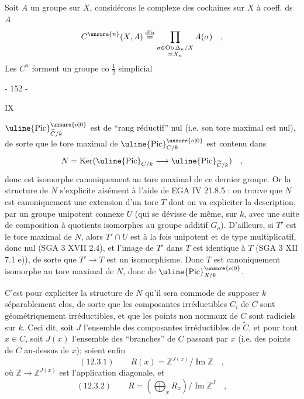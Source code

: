 Soit $A$ un groupe sur $X$, considérons le complexe des cochaines sur $X$ à coeff. ds $A$
\[
C^{\unsure{n}}(X,A)\overset{\mathrm{dfn}}{=}
\prod_{\substack{\sigma\in\operatorname{Ob}\Delta_n/X\\=X_n}}A(\sigma)\quad,
\]
Les $C^n$ forment un groupe co $\frac12$ simplicial



\begin{center}- 152 -\end{center}
\begin{flushright}IX\end{flushright}

$\uline{\operatorname{Pic}}^{\unsure{o|0}}_{\widetilde C/k}$ est de ``rang réductif'' nul (i.e. son tore maximal est nul), de sorte que le tore maximal de $\uline{\operatorname{Pic}}^{\unsure{o|0}}_{C/k}$ est contenu dans
\[
N=\operatorname{Ker}(\uline{\operatorname{Pic}}_{C/k}
\longrightarrow\uline{\operatorname{Pic}}_{\widetilde C/k})\quad,
\]
donc est isomorphe canoniquement au tore maximal de ce dernier groupe. Or la structure de $N$ s'explicite aisément à l'aide de EGA IV 21.8.5 : on trouve que $N$ est canoniquement une extension d'un tore $T$ dont on va expliciter la description, par un groupe unipotent connexe $U$ (qui se dévisse de même, sur $k$, avec une suite de composition à quotients isomorphes au groupe additif $G_a$). D'ailleurs, si $T'$ est le tore maximal de $N$, alors $T'\cap U$ est à la fois unipotent et de type multiplicatif, donc nul (SGA 3 XVII 2.4), et l'image de $T'$ dans $T$ est identique à $T$ (SGA 3 XII 7.1 e)), de sorte que $T'\longrightarrow T$ est un isomorphisme. Donc $T$ est canoniquement isomorphe au tore maximal de $N$, donc de $\uline{\operatorname{Pic}}^{\unsure{o|0}}_{X/k}$.

C'est pour expliciter la structure de $N$ qu'il sera commode de supposer $k$ séparablement clos, de sorte que les composantes irréductibles $C_i$ de $C$ sont géométriquement irréductibles, et que les points non normaux de $C$ sont radiciels sur $k$. Ceci dit, soit $J$ l'ensemble des composantes irréductibles de $\widetilde C$, et pour tout $x\in C$, soit $J(x)$ l'ensemble des ``branches'' de $C$ passant par $x$ (i.e. des points de $\widetilde C$ au-dessus de $x$); soient enfin
\[
(12.3.1)\qquad R(x)=\mathbb Z^{J(x)}/\operatorname{Im}\mathbb Z\quad,
\]
où $\mathbb Z\longrightarrow\mathbb Z^{J(x)}$ est l'application diagonale, et
\[
(12.3.2)\qquad R=(\bigoplus_x R_x)/\operatorname{Im}\mathbb Z^J\quad,
\]

